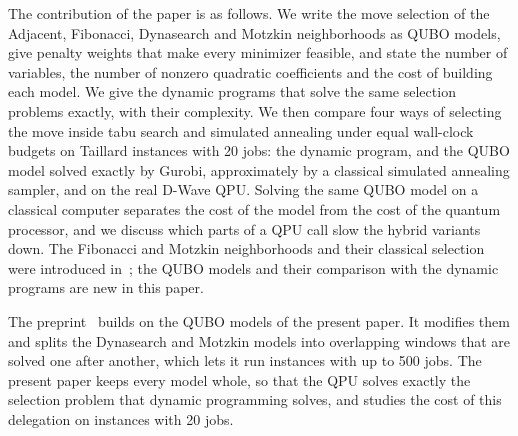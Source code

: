 \documentclass[10pt,twoside,twocolumn,a4paper]{article}
\newif\ifrevmarks \revmarksfalse
\newenvironment{revblock}{\ifrevmarks\color{red}\fi}{}
\begin{document}
\begin{revblock}
The contribution of the paper is as follows. We write the move selection of the Adjacent, Fibonacci, Dynasearch and Motzkin neighborhoods as QUBO models, give penalty weights that make every minimizer feasible, and state the number of variables, the number of nonzero quadratic coefficients and the cost of building each model. We give the dynamic programs that solve the same selection problems exactly, with their complexity. We then compare four ways of selecting the move inside tabu search and simulated annealing under equal wall-clock budgets on Taillard instances with 20 jobs: the dynamic program, and the QUBO model solved exactly by Gurobi, approximately by a classical simulated annealing sampler, and on the real D-Wave QPU. Solving the same QUBO model on a classical computer separates the cost of the model from the cost of the quantum processor, and we discuss which parts of a QPU call slow the hybrid variants down. The Fibonacci and Motzkin neighborhoods and their classical selection were introduced in~\cite{WojewodzkiBozejko2026,Motzkin_PWR_EXIT,Motzkin_PWR}; the QUBO models and their comparison with the dynamic programs are new in this paper.

The preprint~\cite{WojewodzkiBozejkoSSRN} builds on the QUBO models of the present paper. It modifies them and splits the Dynasearch and Motzkin models into overlapping windows that are solved one after another, which lets it run instances with up to 500 jobs. The present paper keeps every model whole, so that the QPU solves exactly the selection problem that dynamic programming solves, and studies the cost of this delegation on instances with 20 jobs.
\end{revblock}
\end{document}
